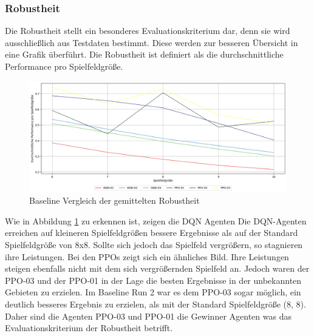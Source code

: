 \subsubsection{Robustheit}
Die Robustheit stellt ein besonderes Evaluationskriterium dar, denn sie wird ausschließlich aus Testdaten bestimmt. Diese werden zur besseren Übersicht in eine Grafik überführt. Die Robustheit ist definiert als die durchschnittliche Performance pro Spielfeldgröße.
\begin{figure}[H]
	\centering
	\includegraphics[scale=0.4517]{Abbildungen/Evaluation/baseline-robustheit.png}
	\caption[Baseline Vergleich Robustheit]{Baseline Vergleich der gemittelten Robustheit}
	\label{fig:Evaluation_Baseline_Robustheit}
\end{figure}
Wie in Abbildung \ref{fig:Evaluation_Baseline_Robustheit} zu erkennen ist, zeigen die DQN Agenten 
Die DQN-Agenten erreichen auf kleineren Spielfeldgrößen bessere Ergebnisse als auf der Standard Spielfeldgröße von 8x8. Sollte sich jedoch das Spielfeld vergrößern, so stagnieren ihre Leistungen.
Bei den PPOs zeigt sich ein ähnliches Bild. Ihre Leistungen steigen ebenfalls nicht mit dem sich vergrößernden Spielfeld an. Jedoch waren der PPO-03 und der PPO-01 in der Lage die besten Ergebnisse in der unbekannten Gebieten zu erzielen. Im Baseline Run 2 war es dem PPO-03 sogar möglich, ein deutlich besseres Ergebnis zu erzielen, als mit der Standard Spielfeldgröße (8, 8).\\
Daher sind die Agenten PPO-03 und PPO-01 die Gewinner Agenten was das Evaluationskriterium der Robustheit betrifft.

